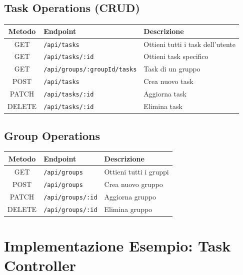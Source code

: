 \documentclass[12pt,a4paper]{report}
\begin{document}
\subsection{Task Operations (CRUD)}

\begin{table}[H]
    \centering
    \begin{tabular}{|c|l|p{7cm}|}
        \hline
        \textbf{Metodo} & \textbf{Endpoint} & \textbf{Descrizione} \\
        \hline
        GET & \texttt{/api/tasks} & Ottieni tutti i task dell'utente \\
        \hline
        GET & \texttt{/api/tasks/:id} & Ottieni task specifico \\
        \hline
        GET & \texttt{/api/groups/:groupId/tasks} & Task di un gruppo \\
        \hline
        POST & \texttt{/api/tasks} & Crea nuovo task \\
        \hline
        PATCH & \texttt{/api/tasks/:id} & Aggiorna task \\
        \hline
        DELETE & \texttt{/api/tasks/:id} & Elimina task \\
        \hline
    \end{tabular}
\end{table}

\subsection{Group Operations}

\begin{table}[H]
    \centering
    \begin{tabular}{|c|l|p{7cm}|}
        \hline
        \textbf{Metodo} & \textbf{Endpoint} & \textbf{Descrizione} \\
        \hline
        GET & \texttt{/api/groups} & Ottieni tutti i gruppi \\
        \hline
        POST & \texttt{/api/groups} & Crea nuovo gruppo \\
        \hline
        PATCH & \texttt{/api/groups/:id} & Aggiorna gruppo \\
        \hline
        DELETE & \texttt{/api/groups/:id} & Elimina gruppo \\
        \hline
    \end{tabular}
\end{table}

\section{Implementazione Esempio: Task Controller}
\end{document}

